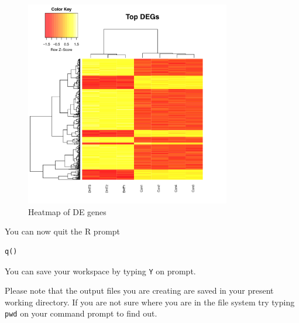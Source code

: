 \begin{steps}
\begin{figure}[H]
\centering
\includegraphics[width=0.8\textwidth]{handout/Heatmap.png}
\caption{Heatmap of DE genes}
\label{fig:Heatmap}
\end{figure}


You can now quit the R prompt
\begin{lstlisting}
q()
\end{lstlisting}
\end{steps}
You can save your workspace by typing \texttt{Y} on prompt.
\begin{note}
Please note that the output files you are creating are saved in your present working directory. If you are not sure where you are in the file system try typing \texttt{pwd} on your command prompt to find out.
\end{note}


